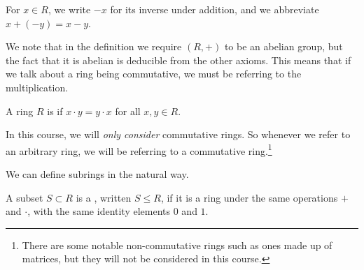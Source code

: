 \begin{remark}[Notation]
	For $x \in R$, we write $-x$ for its inverse under addition, and we abbreviate $x + (-y) = x - y$.
\end{remark}

We note that in the definition we require $(R, +)$ to be an abelian group, but the fact that it is abelian is deducible from the other axioms. This means that if we talk about a ring being commutative, we must be referring to the multiplication.

\begin{definition}
	A ring $R$ is  if $x \cdot y = y \cdot x$ for all $x, y \in R$.
\end{definition}

In this course, we will \emph{only consider} commutative rings. So whenever we refer to an arbitrary ring, we will be referring to a commutative ring.\footnote{There are some notable non-commutative rings such as ones made up of matrices, but they will not be considered in this course.}




We can define subrings in the natural way.

\begin{definition}[Subrings]
	A subset $S \subset R$ is a , written $S \leq R$, if it is a ring under the same operations $+$ and $\cdot$, with the same identity elements $0$ and $1$.
 \end{definition}

